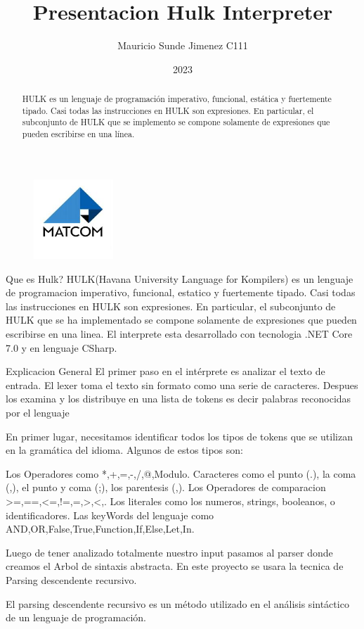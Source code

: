 \documentclass{beamer}
\title[Título]{Presentacion Hulk Interpreter}
\author{Mauricio Sunde Jimenez C111}
\institute[UGR]{
Universidad de La Habana
}
\date{2023}
\begin{document}
\begin{frame}
\titlepage
\begin{figure}[h]
	\center
    \includegraphics[width=3cm]{matcom.jpg}
    \label{fig:logo}
\end{figure}
\end{frame}

\begin{abstract}
	HULK es un lenguaje de programación imperativo, funcional, estática y fuertemente tipado. Casi todas las instrucciones en HULK son expresiones. En particular, el subconjunto de HULK que se implemento se compone solamente de expresiones que pueden escribirse en una línea.
\end{abstract}


\begin{frame}{Que es Hulk?}
    HULK(Havana University Language for Kompilers) es un lenguaje de programacion imperativo, funcional, estatico y fuertemente tipado. Casi todas las instrucciones en HULK son expresiones. En particular, el subconjunto de HULK que
    se ha implementado se compone solamente de expresiones que pueden escribirse en una linea. El interprete esta
    desarrollado con tecnologia .NET Core 7.0 y en lenguaje CSharp.

\end{frame}

\begin{frame}{Explicacion General}
El primer paso en el intérprete es analizar el texto de entrada. El lexer toma el texto sin formato como una serie de caracteres. Despues los examina y los distribuye en una lista de tokens es decir palabras reconocidas por el lenguaje

En primer lugar, necesitamos identificar todos los tipos de tokens que se utilizan en la gramática del idioma. Algunos de estos tipos son:

Los Operadores como *,+,=,-,/,@,Modulo. 
Caracteres como el punto (.), la coma (,), el punto y coma (;), los parentesis (,).
Los Operadores de comparacion >=,==,<=,!=,=,>,<,.
Los literales como los numeros, strings, booleanos, o identificadores.
Las keyWords del lenguaje como AND,OR,False,True,Function,If,Else,Let,In.

Luego de tener analizado totalmente nuestro input pasamos al parser donde creamos el Arbol de sintaxis abstracta.
En este proyecto se usara la tecnica de Parsing descendente recursivo.

El parsing descendente recursivo es un método utilizado en el análisis sintáctico de un lenguaje de programación.
\end{frame}
\end{document}
